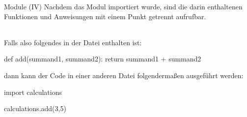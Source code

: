     \begin{frame}[fragile]{Module (IV)}
        Nachdem das Modul importiert wurde, sind die darin enthaltenen Funktionen und Anweisungen mit einem Punkt getrennt aufrufbar.\\~\
        
        Falls also folgendes in der Datei  enthalten ist:

\begin{pythoncode}
def add(summand1, summand2):
    return summand1 + summand2
\end{pythoncode}

    dann kann der Code in einer anderen Datei folgendermaßen ausgeführt werden:
    
\begin{pythoncode}
import calculations

calculations.add(3,5)
\end{pythoncode}
    \end{frame}
    
